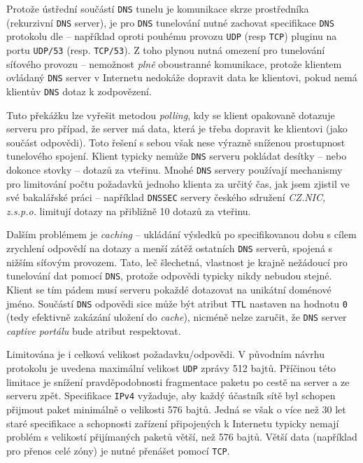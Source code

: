 \documentclass[thesis=M,czech]{FITthesis}[2012/10/20]
\begin{document}
    Protože ústřední součástí \texttt{DNS} tunelu je komunikace skrze prostředníka (rekurzivní \texttt{DNS} server), je pro \texttt{DNS} tunelování nutné zachovat specifikace \texttt{DNS} protokolu dle \cite[RFC 1035]{rfc1035} -- například oproti pouhému provozu \texttt{UDP} (resp \texttt{TCP}) pluginu na portu \texttt{UDP/53} (resp. \texttt{TCP/53}). Z toho plynou nutná omezení pro tunelování síťového provozu -- nemožnost \textit{plně} oboustranné komunikace, protože klientem ovládaný \texttt{DNS} server v Internetu nedokáže dopravit data ke klientovi, pokud nemá klientův \texttt{DNS} dotaz k zodpovězení.
    
    Tuto překážku lze vyřešit metodou \textit{polling}, kdy se klient opakovaně dotazuje serveru pro případ, že server má data, která je třeba dopravit ke klientovi (jako součást odpovědi). Toto řešení s sebou však nese výrazně sníženou prostupnost tunelového spojení. Klient typicky nemůže \texttt{DNS} serveru pokládat desítky -- nebo dokonce stovky -- dotazů za vteřinu. Mnohé \texttt{DNS} servery používají mechanismy pro limitování počtu požadavků jednoho klienta za určitý čas, jak jsem zjistil ve své bakalářské práci \cite{moje-bakalarka} -- například \texttt{DNSSEC} servery českého sdružení \textit{CZ.NIC, z.s.p.o.}\cite{cznic-dnssec} limitují dotazy na přibližně 10 dotazů za vteřinu.
    
    Dalším problémem je \textit{caching} -- ukládání výsledků po specifikovanou dobu s cílem zrychlení odpovědí na dotazy a menší zátěž ostatních \texttt{DNS} serverů, spojená s nižším síťovým provozem. Tato, leč šlechetná, vlastnost je krajně nežádoucí pro tunelování dat pomocí \texttt{DNS}, protože odpovědi typicky nikdy nebudou stejné. Klient se tím pádem musí serveru pokaždé dotazovat na unikátní doménové jméno. Součástí \texttt{DNS} odpovědi sice může být atribut \texttt{TTL} nastaven na hodnotu \texttt{0} (tedy efektivně zakázání uložení do \textit{cache}), nicméně nelze zaručit, že \texttt{DNS} server \textit{captive portálu} bude atribut respektovat.
    
    Limitována je i celková velikost požadavku/odpovědi. V původním návrhu protokolu \cite[RFC 1035]{rfc1035} je uvedena maximální velikost \texttt{UDP} zprávy 512 bajtů. Příčinou této limitace je snížení pravděpodobnosti fragmentace paketu po cestě na server a ze serveru zpět. Specifikace \texttt{IPv4} \cite[RFC 791]{rfc791} vyžaduje, aby každý účastník sítě byl schopen přijmout paket minimálně o velikosti 576 bajtů. Jedná se však o více než 30 let staré specifikace a schopnosti zařízení připojených k Internetu typicky nemají problém s velikostí přijímaných paketů větší, než 576 bajtů. Větší data (například pro přenos celé zóny) je nutné přenášet pomocí \texttt{TCP}.
    
\end{document}
